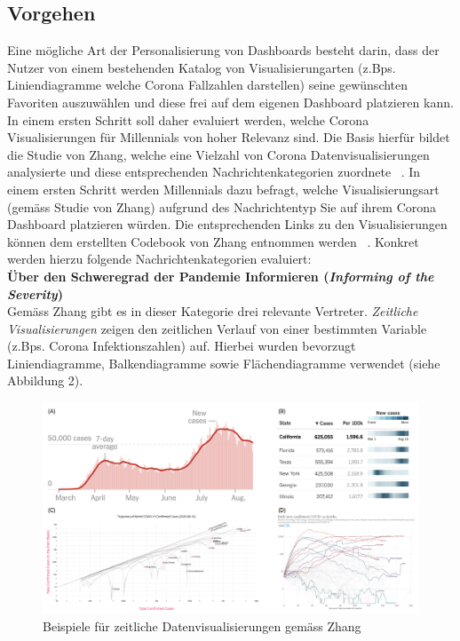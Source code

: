 \documentclass[12pt, oneside]{article}
\begin{document}
\clearpage
\subsection{Vorgehen}
Eine mögliche Art der Personalisierung von Dashboards besteht darin, dass der Nutzer von einem bestehenden Katalog von Visualisierungarten (z.Bps. Liniendiagramme welche Corona Fallzahlen darstellen) seine gewünschten Favoriten auszuwählen und diese frei auf dem eigenen Dashboard platzieren kann. In einem ersten Schritt soll daher evaluiert werden, welche Corona Visualisierungen für Millennials von hoher Relevanz sind. Die Basis hierfür bildet die Studie von Zhang, welche eine Vielzahl von Corona Datenvisualisierungen analysierte und diese entsprechenden Nachrichtenkategorien zuordnete ~\citep{YixuanZhang.}. In einem ersten Schritt werden Millennials dazu befragt, welche Visualisierungsart (gemäss Studie von Zhang) aufgrund des Nachrichtentyp Sie auf ihrem Corona Dashboard platzieren würden. Die entsprechenden Links zu den Visualisierungen können dem erstellten Codebook von Zhang entnommen werden ~\citep{YixuanZhang.2021}. Konkret werden hierzu folgende Nachrichtenkategorien evaluiert:
\\

\textbf{Über den Schweregrad der Pandemie Informieren (\textit{Informing of the Severity})}\\
Gemäss Zhang gibt es in dieser Kategorie drei relevante Vertreter. \textit{Zeitliche Visualisierungen} zeigen den zeitlichen Verlauf von einer bestimmten Variable (z.Bps. Corona Infektionszahlen) auf. Hierbei wurden bevorzugt Liniendiagramme, Balkendiagramme sowie Flächendiagramme verwendet (siehe Abbildung 2).
\begin{figure}[ht]
	\includegraphics[width=12cm]{images/temporal_visualizations.png}
	\centering
	\caption{Beispiele für zeitliche Datenvisualisierungen gemäss Zhang ~\citep[S. 7]{YixuanZhang.}}
\end{figure}
\end{document}
